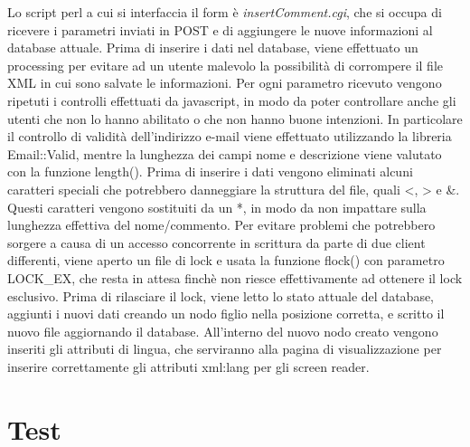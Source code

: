 \documentclass[10pt,a4paper,onecolumn]{article}
\begin{document}
Lo script perl a cui si interfaccia il form è \textit{insertComment.cgi}, che si occupa di ricevere i parametri inviati in POST e di aggiungere le nuove informazioni al database attuale.
Prima di inserire i dati nel database, viene effettuato un processing per evitare ad un utente malevolo la possibilità di corrompere il file XML in cui sono salvate le informazioni.
Per ogni parametro ricevuto vengono ripetuti i controlli effettuati da javascript, in modo da poter controllare anche gli utenti che non lo hanno abilitato o che non hanno buone intenzioni. In particolare il controllo di validità dell’indirizzo e-mail viene effettuato utilizzando la libreria Email::Valid, mentre la lunghezza dei campi nome e descrizione viene valutato con la funzione length().
Prima di inserire i dati vengono eliminati alcuni caratteri speciali che potrebbero danneggiare la struttura del file, quali <, > e \&. Questi caratteri vengono sostituiti da un *, in modo da non impattare sulla lunghezza effettiva del nome/commento.
Per evitare problemi che potrebbero sorgere a causa di un accesso concorrente in scrittura da parte di due client differenti, viene aperto un file di lock e usata la funzione flock() con parametro LOCK\_EX, che resta in attesa finchè non riesce effettivamente ad ottenere il lock esclusivo.
Prima di rilasciare il lock, viene letto lo stato attuale del database, aggiunti i nuovi dati creando un nodo figlio nella posizione corretta, e scritto il nuovo file aggiornando il database. All’interno del nuovo nodo creato vengono inseriti gli attributi di lingua, che serviranno alla pagina di visualizzazione per inserire correttamente gli attributi xml:lang per gli screen reader.

\clearpage

\section{Test}
\end{document}
